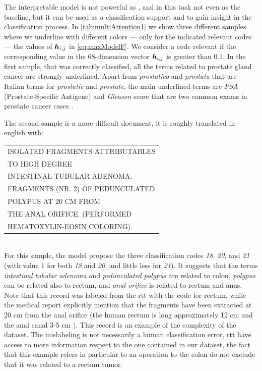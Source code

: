 The interpretable model is not powerful as \maxp{}, and in this task
not even as the baseline, but it can be used as a
classification support and to 
gain insight in the classification process. In
\cref{tab:multiAttention1} we show three different samples where we
underline with different colors --- only for the indicated relevant
codes --- the values of $\bm{h}_{i,j}$ in \eqref{eq:maxModelF}. We
consider a code relevant if the corresponding value in the
68-dimension vector $\bm{h}_{i,j}$ is greater than $0.1$. In the
first sample, that was correctly classified, all the terms related to
prostate gland cancer are strongly underlined. Apart from
\emph{prostatico} and \emph{prostata} that are Italian terms for
\emph{prostatic} and \emph{prostate}, the main underlined terms are
\emph{PSA} (Prostate-Specific Antigene) and \emph{Gleason} score that
are two common exams in prostate cancer cases
\cite{brimo2013prostate}.

The second sample is a more difficult
document, it is roughly translated in english with:\\
\begin{small}
  \ttfamily
  \begin{tabular}{l}
    ISOLATED FRAGMENTS ATTRIBUTABLES\\
    TO HIGH DEGREE\\
    INTESTINAL TUBULAR ADENOMA.\\
    FRAGMENTS (NR. 2) OF PEDUNCULATED\\
    POLYPUS AT 20 CM FROM\\
    THE ANAL ORIFICE. (PERFORMED\\
    HEMATOXYLIN-EOSIN COLORING).
\end{tabular}
\end{small}\\
For this sample, the model propose the three classification codes \emph{18},
\emph{20}, and \emph{21} (with value $1$ for both \emph{18} and
\emph{20}, and little less for \emph{21}). It suggests that the terms
\emph{intestinal tubular adenoma} and \emph{pedunculated polypus} are
related to colon, \emph{polypus} can be related also to rectum, and
\emph{anal orifice} is related to rectum and anus. Note that this
record was labeled from the \ac{rtt} with the code for rectum, while
the medical report 
explicitly mention that the fragments have been extracted at 20 cm
from the anal orifice (the human rectum is long approximately 12 cm
and the anal canal 3-5 cm \cite{greene2006ajcc}). This record is an
example of the complexity of the dataset. The mislabeling is not
necessarily a human classification error, \ac{rtt} have access to more
information respect to the one contained in our dataset, the fact that
this example refers in particular to an operation to the colon do not
exclude that it was related to a rectum tumor.

